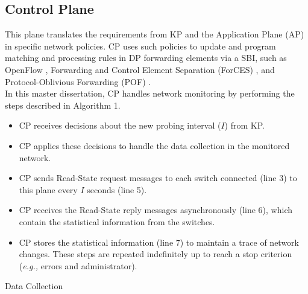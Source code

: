 \subsection{Control Plane}
This plane translates the requirements from KP and the Application Plane (AP) in specific network policies. CP uses such policies to update and program matching and processing rules in DP forwarding elements via a SBI, such as OpenFlow \cite{onf_2012:openflow}, Forwarding and Control Element Separation (ForCES) \cite{doria_2010:forces}, and Protocol-Oblivious Forwarding (POF) \cite{song_2013:POF}. \\

In this master dissertation, CP handles network monitoring by performing the steps described in Algorithm 1. 

\begin{itemize}
    \item CP receives decisions about the new probing interval ($I$) from KP.
    \item CP applies these decisions to handle the data collection in the monitored network.
    \item CP sends Read-State request messages to each switch connected (line 3) to this plane every $I$ seconds (line 5).
    \item CP receives the Read-State reply messages asynchronously (line 6), which contain the statistical information from the switches.
    \item CP stores the statistical information (line 7) to maintain a trace of network changes. These steps are repeated indefinitely up to reach a stop criterion (\textit{e.g.,} errors and administrator).
\end{itemize}{}

\newlength{\commentWidth}
\setlength{\commentWidth}{7cm}
\newcommand{\atcp}[1]{\tcp*[r]{\makebox[\commentWidth]{#1\hfill}}}
\begin{english_algorithm}
\footnotesize
\SetAlgoLined
{}

\BlankLine
\label{alg:ipro_collection}
\caption{Data Collection}
\end{english_algorithm}

